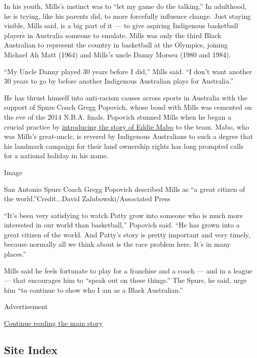 In his youth, Mills's instinct was to ``let my game do the talking.'' In
adulthood, he is trying, like his parents did, to more forcefully
influence change. Just staying visible, Mills said, is a big part of it
--- to give aspiring Indigenous basketball players in Australia someone
to emulate. Mills was only the third Black Australian to represent the
country in basketball at the Olympics, joining Michael Ah Matt (1964)
and Mills's uncle Danny Morseu (1980 and 1984).

``My Uncle Danny played 30 years before I did,'' Mills said. ``I don't
want another 30 years to go by before another Indigenous Australian
plays for Australia.''

He has thrust himself into anti-racism causes across sports in Australia
with the support of Spurs Coach Gregg Popovich, whose bond with Mills
was cemented on the eve of the 2014 N.B.A. finals. Popovich stunned
Mills when he began a crucial practice by
\href{https://www.si.com/nba/2015/03/24/patty-mills-australia-san-antonio-spurs-bala-gregg-popovich}{introducing
the story of Eddie Mabo} to the team. Mabo, who was Mills's great-uncle,
is revered by Indigenous Australians to such a degree that his landmark
campaign for their land ownership rights has long prompted calls for a
national holiday in his name.

Image

San Antonio Spurs Coach Gregg Popovich described Mills as ``a great
citizen of the world.''Credit...David Zalubowski/Associated Press

``It's been very satisfying to watch Patty grow into someone who is much
more interested in our world than basketball,'' Popovich said. ``He has
grown into a great citizen of the world. And Patty's story is pretty
important and very timely, because normally all we think about is the
race problem here. It's in many places.''

Mills said he feels fortunate to play for a franchise and a coach ---
and in a league --- that encourages him to ``speak out on these
things.'' The Spurs, he said, urge him ``to continue to show who I am as
a Black Australian.''

Advertisement

\protect\hyperlink{after-bottom}{Continue reading the main story}

\hypertarget{site-index}{%
\subsection{Site Index}\label{site-index}}


